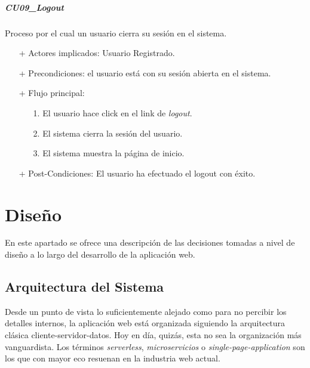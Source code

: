 \documentclass[a4paper,12pt,twoside,openright]{report}
\begin{document}
            \paragraph{CU09\_Logout}
                Proceso por el cual un usuario cierra su sesión en el sistema.
                \begin{itemize}
                    \item[+] Actores implicados: Usuario Registrado.
                    \item[+] Precondiciones: el usuario está con su sesión abierta en el sistema.
                    \item[+] Flujo principal:
                    \begin{enumerate}
                        \item[1.] El usuario hace click en el link de \emph{logout}.
                        \item[2.] El sistema cierra la sesión del usuario.
                        \item[3.] El sistema muestra la página de inicio.
                    \end{enumerate}
                    \item[+] Post-Condiciones: El usuario ha efectuado el logout con éxito.
                \end{itemize}

    \chapter{Diseño} \label{sec:design}
    En este apartado se ofrece una descripción de las decisiones tomadas a nivel de diseño a lo largo del desarrollo de la aplicación web.
    
    \section{Arquitectura del Sistema}
    Desde un punto de vista lo suficientemente alejado como para no percibir los detalles internos, la aplicación web está organizada siguiendo la arquitectura clásica cliente-servidor-datos. Hoy en día, quizás, esta no sea la organización más vanguardista. Los términos \emph{serverless}, \emph{microservicios} o \emph{single-page-application} son los que con mayor eco resuenan en la industria web actual.
    
\end{document}
